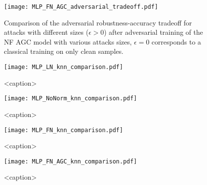 \begin{figure}[htbp]
	\centering
	\texttt{[image: MLP\_FN\_AGC\_adversarial\_tradeoff.pdf]}
	\caption[ NF AGC adversarial robustness-accuracy tradeoff]{Comparison of the adversarial robustness-accuracy tradeoff for  attacks with different sizes (\(\epsilon > 0\)) after adversarial training of the  NF AGC model with various  attacks sizes, \(\epsilon = 0\) corresponds to a classical training on only clean samples. }\label{fig:mlp_fnagcadv_tradeoff}
\end{figure}

\begin{landscape}
	\begin{figure}[htbp]
		\centering
		\texttt{[image: MLP\_LN\_knn\_comparison.pdf]}
		\caption{<caption>}\label{fig:mlp_ln_knn_comp}
	\end{figure}

	\begin{figure}[htbp]
		\centering
		\texttt{[image: MLP\_NoNorm\_knn\_comparison.pdf]}
		\caption{<caption>}\label{fig:mlp_nonorm_knn_comp}
	\end{figure}

	\begin{figure}[htbp]
		\centering
		\texttt{[image: MLP\_FN\_knn\_comparison.pdf]}
		\caption{<caption>}\label{fig:mlp_fn_knn_comp}
	\end{figure}

	\begin{figure}[htbp]
		\centering
		\texttt{[image: MLP\_FN\_AGC\_knn\_comparison.pdf]}
		\caption{<caption>}\label{fig:mlp_fnagc_knn_comp}
	\end{figure}
\end{landscape}